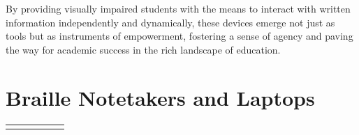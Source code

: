 \documentclass[14pt,letterpaper,twoside]{extreport}
\begin{document}
By providing visually impaired students with the means to interact with written information independently and dynamically, these devices emerge not just as tools but as instruments of empowerment, fostering a sense of agency and paving the way for academic success in the rich landscape of education.

\hypertarget{braille-notetakers-and-braille-laptop-computers}{%
	\section{Braille Notetakers and Laptops}\label{braille-notetakers-and-braille-laptop-computers}}

\begin{longtable}[]{@{}
	>{\raggedright\arraybackslash}m{}
	>{\raggedright\arraybackslash}m{}
	>{\raggedright\arraybackslash}m{}
	>{\raggedright\arraybackslash}m{}
	>{\raggedright\arraybackslash}m{}
	>{\raggedright\arraybackslash}m{}@{}
	}
	\toprule\noalign{}


\end{longtable}
\end{document}
